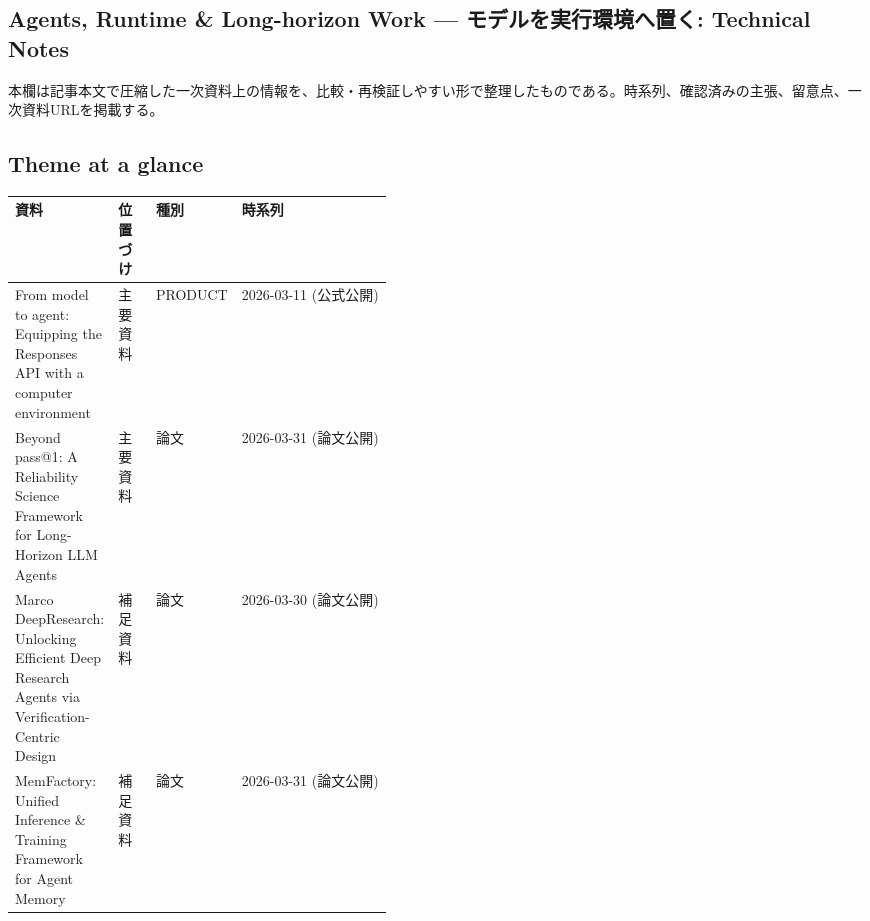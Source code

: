 \subsection*{Agents, Runtime \& Long-horizon Work — モデルを実行環境へ置く: Technical Notes}
本欄は記事本文で圧縮した一次資料上の情報を、比較・再検証しやすい形で整理したものである。時系列、確認済みの主張、留意点、一次資料URLを掲載する。
\medskip
\subsection*{Theme at a glance}
\begin{center}
\footnotesize
\begin{tabularx}{\linewidth}{@{}p{0.20\linewidth}p{0.10\linewidth}p{0.14\linewidth}X@{}}
\toprule
資料 & 位置づけ & 種別 & 時系列 \\
\midrule
From model to agent: Equipping the Responses API with a computer environment & 主要資料 & PRODUCT & 2026-03-11 (公式公開) \\
Beyond pass@1: A Reliability Science Framework for Long-Horizon LLM Agents & 主要資料 & 論文 & 2026-03-31 (論文公開) \\
Marco DeepResearch: Unlocking Efficient Deep Research Agents via Verification-Centric Design & 補足資料 & 論文 & 2026-03-30 (論文公開) \\
MemFactory: Unified Inference \& Training Framework for Agent Memory & 補足資料 & 論文 & 2026-03-31 (論文公開) \\
\bottomrule
\end{tabularx}
\end{center}
\normalsize

